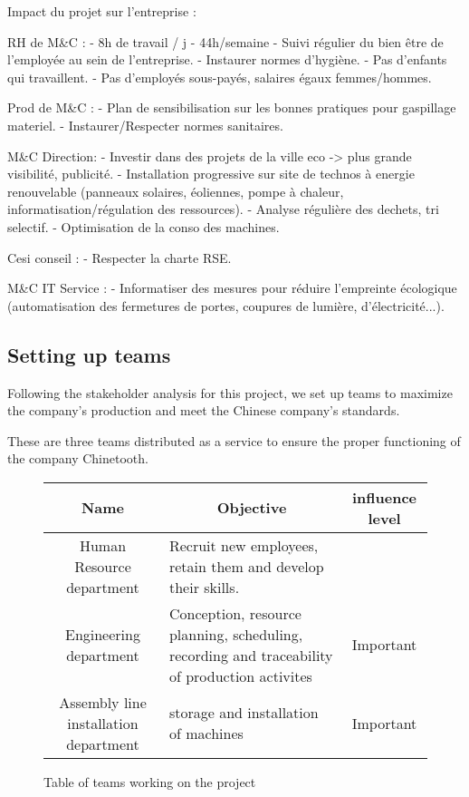Impact du projet sur l'entreprise : 

RH de M\&C :
- 8h de travail / j - 44h/semaine
- Suivi régulier du bien être de l'employée au sein de l'entreprise.
- Instaurer normes d'hygiène.
- Pas d'enfants qui travaillent.
- Pas d'employés sous-payés, salaires égaux femmes/hommes. 

Prod de M\&C :
- Plan de sensibilisation sur les bonnes pratiques pour gaspillage materiel.
- Instaurer/Respecter normes sanitaires.

M\&C Direction:
- Investir dans des projets de la ville eco -> plus grande visibilité, publicité.
- Installation progressive sur site de technos à energie renouvelable (panneaux solaires, éoliennes, pompe à chaleur, informatisation/régulation des ressources).
- Analyse régulière des dechets, tri selectif.
- Optimisation de la conso des machines.

Cesi conseil :
- Respecter la charte RSE.

M\&C IT Service :
- Informatiser des mesures pour réduire l'empreinte écologique (automatisation des fermetures de portes, coupures de lumière, d'électricité...).



 


\subsection{Setting up teams}

Following the stakeholder analysis for this project, we set up teams to maximize the company's production and meet the Chinese company's standards.

These are three teams distributed as a service to ensure the proper functioning of the company Chinetooth.

\begin{figure}[h]
\centering
\begin{tabular}{| c | p{6cm} | c |}
    \hline
    \rowcolor{heading-color}Name & \multicolumn{1}{c|}{Objective} & influence level \\
    \hline
    Human Resource department & Recruit new employees, retain them and develop their skills. & \\
    \hline
    Engineering department & Conception, resource planning, scheduling, recording and traceability of production activites & Important \\
    \hline 
    Assembly line installation department & storage and installation of machines & Important \\
    \hline 
\end{tabular}
\caption{Table of teams working on the project}
\end{figure}

